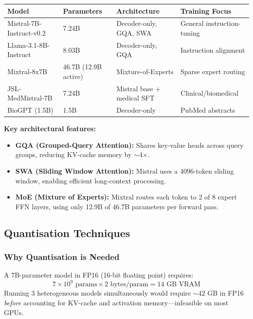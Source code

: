 \begin{center}
\begin{tabular}{@{}llll@{}}
\toprule
\textbf{Model} & \textbf{Parameters} & \textbf{Architecture} & \textbf{Training Focus} \\
\midrule
Mistral-7B-Instruct-v0.2 & 7.24B & Decoder-only, GQA, SWA & General instruction-tuning \\
Llama-3.1-8B-Instruct & 8.03B & Decoder-only, GQA & Instruction alignment \\
Mixtral-8x7B & 46.7B (12.9B active) & Mixture-of-Experts & Sparse expert routing \\
JSL-MedMistral-7B & 7.24B & Mistral base + medical SFT & Clinical/biomedical \\
BioGPT (1.5B) & 1.5B & Decoder-only & PubMed abstracts \\
\bottomrule
\end{tabular}
\end{center}

\textbf{Key architectural features:}
\begin{itemize}
    \item \textbf{GQA (Grouped-Query Attention):} Shares key-value heads across query groups, reducing KV-cache memory by $\sim$4$\times$.
    \item \textbf{SWA (Sliding Window Attention):} Mistral uses a 4096-token sliding window, enabling efficient long-context processing.
    \item \textbf{MoE (Mixture of Experts):} Mixtral routes each token to 2 of 8 expert FFN layers, using only 12.9B of 46.7B parameters per forward pass.
\end{itemize}

\subsection{Quantisation Techniques}

\subsubsection{Why Quantisation is Needed}
A 7B-parameter model in FP16 (16-bit floating point) requires:
\[
7 \times 10^9 \text{ params} \times 2 \text{ bytes/param} = 14 \text{ GB VRAM}
\]
Running 3 heterogeneous models simultaneously would require $\sim$42 GB in FP16 \textit{before} accounting for KV-cache and activation memory---infeasible on most GPUs.

